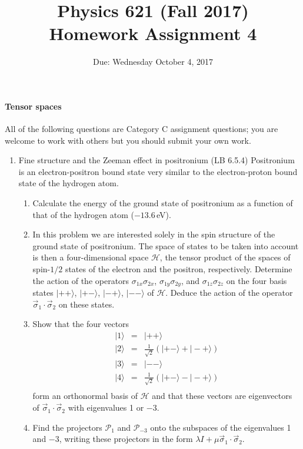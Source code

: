 \documentclass[letterpaper,11pt]{article}
\title{Physics 621 (Fall 2017) \\ Homework Assignment 4}
\date{Due: Wednesday October 4, 2017}
\begin{document}
\maketitle

\paragraph*{Tensor spaces}

All of the following questions are Category C assignment questions; you are welcome to work with others but you should submit your own work.

\begin{enumerate}
  \item Fine structure and the Zeeman effect in positronium (LB 6.5.4)
  Positronium is an electron-positron bound state very similar to the electron-proton bound state of the hydrogen atom.
  \begin{enumerate}
    \item Calculate the energy of the ground state of positronium as a function of that of the hydrogen atom ($-13.6$\,eV).
    \item In this problem we are interested solely in the spin structure of the ground state of positronium. The space of states to be taken into account is then a four-dimensional space $\mathcal{H}$, the tensor product of the spaces of spin-$1/2$ states of the electron and the positron, respectively. Determine the action of the operators $\sigma_{1x}\sigma_{2x}$, $\sigma_{1y}\sigma_{2y}$, and $\sigma_{1z}\sigma_{2z}$ on the four basis states $|++\rangle$, $|+-\rangle$, $|-+\rangle$, $|--\rangle$ of $\mathcal{H}$. Deduce the action of the operator $\vec\sigma_1 \cdot \vec\sigma_2$ on these states.
    \item Show that the four vectors
    \begin{eqnarray*}
      |1\rangle & = & |++\rangle \\
      |2\rangle & = & \frac{1}{\sqrt{2}} ( |+-\rangle + |-+\rangle ) \\
      |3\rangle & = & |--\rangle \\
      |4\rangle & = & \frac{1}{\sqrt{2}} ( |+-\rangle - |-+\rangle ) \\
    \end{eqnarray*}
    form an orthonormal basis of $\mathcal{H}$ and that these vectors are eigenvectors of $\vec\sigma_1 \cdot \vec\sigma_2$ with eigenvalues 1 or $-3$.
    \item Find the projectors $\mathcal{P}_1$ and $\mathcal{P}_{-3}$ onto the subspaces of the eigenvalues 1 and $-3$, writing these projectors in the form $\lambda I + \mu \vec\sigma_1 \cdot \vec\sigma_2$.

\end{enumerate}
\end{enumerate}
\end{document}
